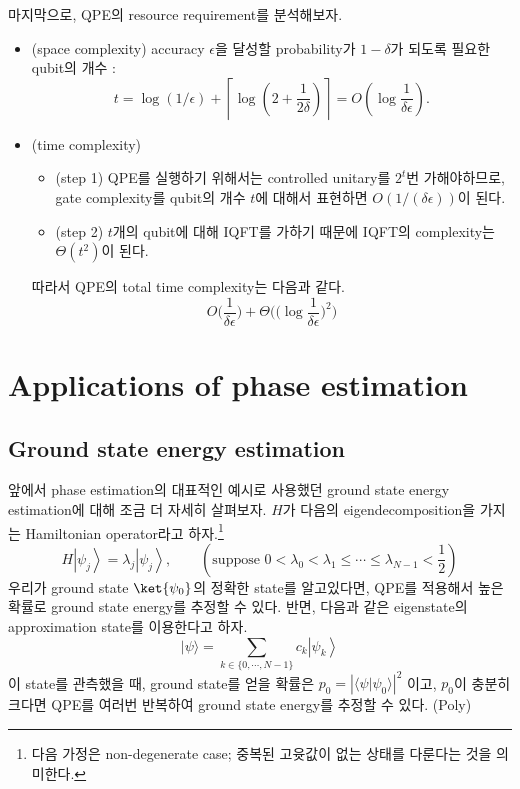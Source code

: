 \vspace{1em}
마지막으로, QPE의 resource requirement를 분석해보자. 
\begin{itemize}
  \item (space complexity) accuracy $\epsilon$을 달성할 probability가 $1-\delta$가 되도록 필요한 qubit의 개수 :
  \begin{equation*}
    t=\log (1 / \epsilon)+\left\lceil\log \left(2+\frac{1}{2 \delta}\right)\right\rceil=O\left(\log \frac{1}{\delta \epsilon}\right) .
    \end{equation*}
  \item (time complexity) 
  \begin{itemize}
    \item (step 1) QPE를 실행하기 위해서는 controlled unitary를 $2^t$번 가해야하므로, gate complexity를 qubit의 개수 $t$에 대해서 표현하면 $O(1/(\delta \epsilon))$이 된다.
    \item (step 2) $t$개의 qubit에 대해 IQFT를 가하기 때문에 IQFT의 complexity는 $\Theta(t^2)$이 된다.
  \end{itemize}
  따라서 QPE의 total time complexity는 다음과 같다.
  \begin{equation*}
    O\bigg(\frac{1}{\delta \epsilon} \bigg) + \Theta\bigg(\bigg(\log \frac{1}{\delta \epsilon}\bigg)^2\bigg)
  \end{equation*}
\end{itemize}

\section{Applications of phase estimation}
\subsection{Ground state energy estimation}
앞에서 phase estimation의 대표적인 예시로 사용했던 ground state energy estimation에 대해 조금 더 자세히 살펴보자.
$H$가 다음의 eigendecomposition을 가지는 Hamiltonian operator라고 하자.\footnote{다음 가정은 non-degenerate case; 중복된 고윳값이 없는 상태를 다룬다는 것을 의미한다.}
\begin{equation*}
  H\left|\psi_j\right\rangle=\lambda_j\left|\psi_j\right\rangle, \qquad (\text{suppose } 0 < \lambda_0   < \lambda_1 \leq \cdots \leq \lambda_{N-1} < \frac{1}{2}) 
\end{equation*}
우리가 ground state $\ket{\psi_0}$의 정확한 state를 알고있다면, QPE를 적용해서 높은 확률로 ground state energy를 추정할 수 있다.
반면, 다음과 같은 eigenstate의 approximation state를 이용한다고 하자. 
\begin{equation*}
  |\psi\rangle=\sum_{k \in \{0, \cdots, N-1\}} c_k\left|\psi_k\right\rangle
\end{equation*}
이 state를 관측했을 때, ground state를 얻을 확률은 $p_0 = |\langle{\psi|\psi_0}\rangle|^2$ 이고, $p_0$이 충분히 크다면 QPE를 여러번 반복하여 ground state energy를 추정할 수 있다. (Poly)

